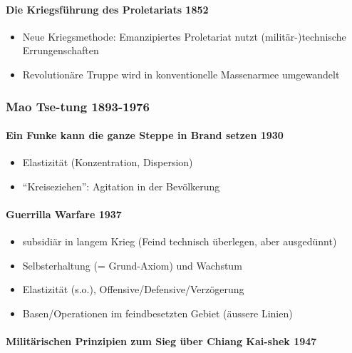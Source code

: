 {}\documentclass[a4paper]{article}
\providecommand{\tightlist}{\setlength{\itemsep}{1mm}\setlength{\parskip}{1mm}}
\begin{document}
\paragraph{Die Kriegsführung des Proletariats
	1852}\label{die-kriegsfuxfchrung-des-proletariats-1852}

\begin{itemize}
	\tightlist
	\item
	      Neue Kriegsmethode: Emanzipiertes Proletariat nutzt
	      (militär-)technische Errungenschaften
	\item
	      Revolutionäre Truppe wird in konventionelle Massenarmee umgewandelt
\end{itemize}

\subsubsection{Mao Tse-tung 1893-1976}\label{mao-tse-tung-1893-1976}

\paragraph{Ein Funke kann die ganze Steppe in Brand setzen
	1930}\label{ein-funke-kann-die-ganze-steppe-in-brand-setzen-1930}

\begin{itemize}
	\tightlist
	\item
	      Elastizität (Konzentration, Dispersion)
	\item
	      ``Kreiseziehen'': Agitation in der Bevölkerung
\end{itemize}

\paragraph{Guerrilla Warfare 1937}\label{guerrilla-warfare-1937}

\begin{itemize}
	\tightlist
	\item
	      subsidiär in langem Krieg (Feind technisch überlegen, aber ausgedünnt)
	\item
	      Selbsterhaltung (= Grund-Axiom) und Wachstum
	\item
	      Elastizität (s.o.), Offensive/Defensive/Verzögerung
	\item
	      Basen/Operationen im feindbesetzten Gebiet (äussere Linien)
\end{itemize}

\paragraph{Militärischen Prinzipien zum Sieg über Chiang Kai-shek
	1947}\label{milituxe4rischen-prinzipien-zum-sieg-uxfcber-chiang-kai-shek-1947}
\end{document}
